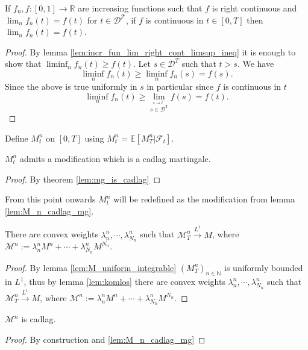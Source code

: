\begin{lemma}\label{lem:incr_fun_lim_right_cont_lim_eq}
  If $f_n, f : [0, 1] \rightarrow \mathbb{R}$ are increasing functions such that $f$ is right continuous and
  $\lim_n f_n(t) = f (t)$ for $t \in\mathcal{D^T}$, if $f$ is continuous in $t\in[0,T]$ then $\lim_n  f_n(t) = f (t)$.
\end{lemma}

\begin{proof}
  By lemma \ref{lem:incr_fun_lim_right_cont_limsup_ineq} it is enough to show that $\liminf_n f_n(t)\geq f(t)$.
  Let $s\in\mathcal{D}^T$ such that $t>s$. We have
  $$
  \liminf_n f_n(t)\geq \liminf_n f_n(s)=f(s).
  $$
  Since the above is true uniformly in $s$ in particular since $f$ is continuous in $t$
  $$
  \liminf_n f_n(t)\geq\lim_{\stackrel{s\rightarrow t^-}{s\in\mathcal{D}^T}}f(s)=f(t).
$$
\end{proof}

Define $M^n_t$ on $[0,T]$ using $M^n_t=\mathbb{E}[M^n_T\vert\mathcal{F}_t]$.

\begin{lemma}\label{lem:M_n_cadlag_mg}
  $M^n_t$ admits a modification which is a cadlag martingale.
\end{lemma}

\begin{proof}
  By theorem \ref{lem:mg_is_cadlag}
\end{proof}

From this point onwards $M^n_t$ will be redefined as the modification from lemma \ref{lem:M_n_cadlag_mg}.

\begin{lemma}\label{lem:M_cal_converges_L1}
  There are convex weights $\lambda^n_n,\cdots,\lambda^n_{N_n}$ such that
  $\mathcal{M}^n_T\stackrel{L^1}{\rightarrow}M$, where $\mathcal{M}^n:=\lambda^n_nM^n+\cdots +\lambda^n_{N_n}M^{N_n}.$
\end{lemma}
\begin{proof}
  By lemma \ref{lem:M_uniform_integrable} $(M^n_T)_{n\in\mathbb{N}}$ is uniformly bounded in $L^1$, thus by lemma \ref{lem:komlos} there are convex weights $\lambda^n_n,\cdots,\lambda^n_{N_n}$ such that
  $\mathcal{M}^n_T\stackrel{L^1}{\rightarrow}M$, where $\mathcal{M}^n:=\lambda^n_nM^n+\cdots +\lambda^n_{N_n}M^{N_n}.$
\end{proof}

\begin{lemma}\label{lem:M_cal_cadlag}
  $\mathcal{M}^n$ is cadlag.
\end{lemma}
\begin{proof}
  By construction and \ref{lem:M_n_cadlag_mg}
\end{proof}

